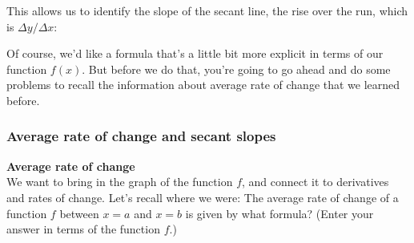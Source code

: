 \documentclass[pdftex, brazil, 12pt, twoside]{article}
\begin{document}
This allows us to identify the slope
of the secant line, the rise over the run, which
is $\Delta y / \Delta x$:

\begin{figure}[H]
  \begin{center}
  \end{center}
\end{figure}

Of course, we'd like a formula that's
a little bit more explicit in terms of our function $f(x)$.
But before we do that, you're going
to go ahead and do some problems to recall
the information about average rate of change
that we learned before.

\subsubsection{Average rate of change and secant slopes}
\label{u1-geometric-ex-avg-rate-secant}

\begin{exercise}
  \textbf{Average rate of change}\\%
  We want to bring in the graph of the function $f$, and connect it to derivatives
  and rates of change. Let's recall where we were: The average rate of change of
  a function $f$ between $x=a$ and $x=b$ is given by what formula?
  (Enter your answer in terms of the function $f$.)
\end{exercise}
\end{document}
